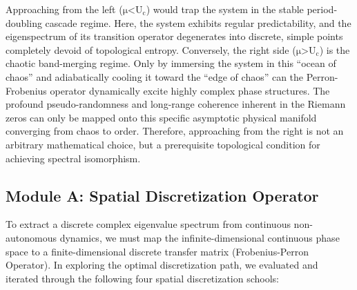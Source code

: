 Approaching from the left (\(\text{μ}\text{<}\text{U}_{\text{c}}\))
would trap the system in the stable period-doubling cascade regime.
Here, the system exhibits regular predictability, and the eigenspectrum
of its transition operator degenerates into discrete, simple points
completely devoid of topological entropy. Conversely, the right side
(\(\text{μ}\text{>}\text{U}_{\text{c}}\)) is the chaotic band-merging
regime. Only by immersing the system in this ``ocean of chaos'' and
adiabatically cooling it toward the ``edge of chaos'' can the
Perron-Frobenius operator dynamically excite highly complex phase
structures. The profound pseudo-randomness and long-range coherence
inherent in the Riemann zeros can only be mapped onto this specific
asymptotic physical manifold converging from chaos to order. Therefore,
approaching from the right is not an arbitrary mathematical choice, but
a prerequisite topological condition for achieving spectral isomorphism.

\subsection*{Module A: Spatial Discretization Operator}

To extract a discrete complex eigenvalue spectrum from continuous
non-autonomous dynamics, we must map the infinite-dimensional continuous
phase space to a finite-dimensional discrete transfer matrix
(Frobenius-Perron Operator). In exploring the optimal discretization
path, we evaluated and iterated through the following four spatial
discretization schools:

